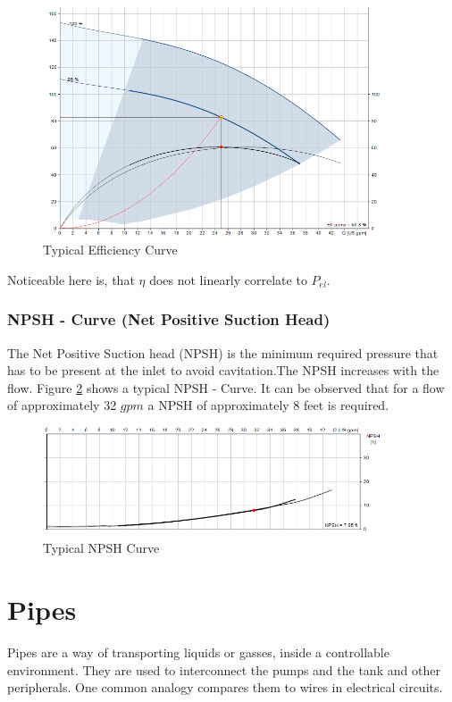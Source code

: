 \begin{figure}[h]
	\centering
	\includegraphics[width=0.9\textwidth]{figures/03physicalSetup/typicalEfficiencyCurve.PNG}
	\caption{Typical Efficiency Curve}
	\label{fig:typicalEfficiencyCurve}
\end{figure}
Noticeable here is,
that $\eta$ does not linearly correlate to $P_{el}$.

\subsubsection{NPSH - Curve (Net Positive Suction Head)}
The Net Positive Suction head (NPSH) is the minimum required pressure that has to be present at the inlet to avoid 
cavitation.The NPSH increases with the flow.
Figure \ref{fig:typicalNPSHCurve} shows a typical NPSH - Curve. It can be observed that for a flow of approximately 32 $gpm$
a NPSH of approximately 8 feet is required.

\begin{figure}[h]
	\centering
	\includegraphics[width=0.9\textwidth]{figures/03physicalSetup/typicalNPSHCurve.PNG}
	\caption{Typical NPSH Curve}
	\label{fig:typicalNPSHCurve}
\end{figure}

\section{Pipes}
Pipes are a way of transporting liquids or gasses, inside a controllable environment.
They are used to interconnect the pumps and the tank and other peripherals.
One common analogy compares them to wires in electrical circuits.


